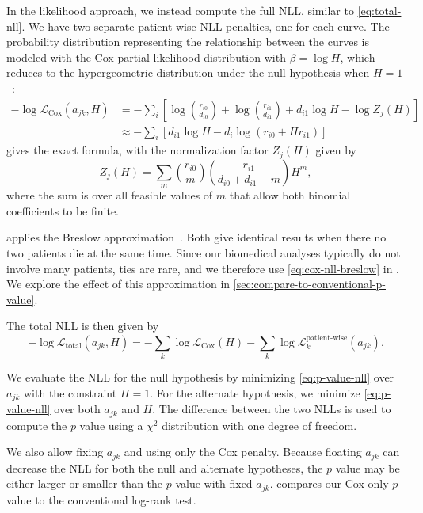 \documentclass[article]{jss}
\begin{document}
In the likelihood approach, we instead compute the full NLL, similar to \cref{eq:total-nll}. We have two separate patient-wise NLL penalties, one for each curve. The probability distribution representing the relationship between the curves is modeled with the Cox partial likelihood distribution with \(\beta=\log{H}\), which reduces to the hypergeometric distribution under the null hypothesis when \(H=1\)~\citep{cox1972regression,breslow1974covariance}:
\begin{align}
-\log \mathcal{L}_{\text{Cox}}(a_{jk}, H)&=-\sum_i\left[\log\binom{r_{i0}}{d_{i0}}+\log\binom{r_{i1}}{d_{i1}}+d_{i1}\log H-\log Z_j(H)\right] \label{eq:cox-nll-exact}\\
&\approx-\sum_i \left[d_{i1} \log H - d_i \log\left(r_{i0} + H r_{i1}\right)\right] \label{eq:cox-nll-breslow}
\end{align}
 gives the exact formula, with the normalization factor \(Z_j(H)\) given by
\begin{equation}
Z_j(H) = \sum_{m}\binom{r_{i0}}{m}\binom{r_{i1}}{d_{i0}+d_{i1}-m}H^m,
\label{eq:cox-normalization}
\end{equation}
where the sum is over all feasible values of \(m\) that allow both binomial coefficients to be finite.

 applies the Breslow approximation~\citep{breslow1974covariance}. Both give identical results when there no two patients die at the same time. Since our biomedical analyses typically do not involve many patients, ties are rare, and we therefore use \cref{eq:cox-nll-breslow} in . We explore the effect of this approximation in \cref{sec:compare-to-conventional-p-value}.

The total NLL is then given by
\begin{equation}
-\log \mathcal{L}_{\text{total}}(a_{jk}, H) = -\sum_{k}\log\mathcal{L}_\text{Cox}(H) - \sum_{k}\log\mathcal{L}_k^{\text{patient-wise}}(a_{jk}).
\label{eq:p-value-nll}
\end{equation}

We evaluate the NLL for the null hypothesis by minimizing \cref{eq:p-value-nll} over \(a_{jk}\) with the constraint \(H=1\). For the alternate hypothesis, we minimize \cref{eq:p-value-nll} over both \(a_{jk}\) and \(H\). The difference between the two NLLs is used to compute the \(p\) value using a \(\chi^2\) distribution with one degree of freedom.

We also allow fixing \(a_{jk}\) and using only the Cox penalty. Because floating \(a_{jk}\) can decrease the NLL for both the null and alternate hypotheses, the \(p\) value may be either larger or smaller than the \(p\) value with fixed \(a_{jk}\).  compares our Cox-only \(p\) value to the conventional log-rank test.
\end{document}
